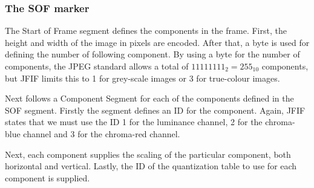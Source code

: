 \begin{infobox}
\subsubsection*{The SOF marker}
\begin{centering}
\end{centering}

The Start of Frame segment defines the components in the frame. 
First, the height and width of the image in pixels are encoded. 
After that, a byte is used for defining the number of following component.
By using a byte for the number of components, the JPEG standard allows a total of $11111111_2=255_{10}$ components, but JFIF limits this to 1 for grey-scale images or 3 for true-colour images.

Next follows a Component Segment for each of the components defined in the SOF segment.
Firstly the segment defines an ID for the component.
Again, JFIF states that we must use the ID 1 for the luminance channel, 2 for the chroma-blue channel and 3 for the chroma-red channel.

Next, each component supplies the scaling of the particular component, both horizontal and vertical.
Lastly, the ID of the quantization table to use for each component is supplied. 

\begin{centering}
\end{centering}


\end{infobox}
